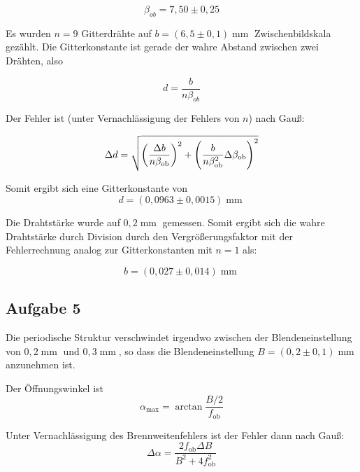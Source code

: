 \documentclass[a4paper,german,12pt,smallheadings]{scrartcl}
\begin{document}
\begin{equation}
  \beta_{ob} = 7{,}50 \pm 0{,}25
\end{equation}

Es wurden $n = 9$ Gitterdrähte auf $b = (6{,}5\pm0{,}1) \operatorname{mm}$
Zwischenbildskala gezählt. Die Gitterkonstante ist gerade der wahre Abstand
zwischen zwei Drähten, also

\begin{equation}
  d = \frac{b}{n \beta_{ob}}
\end{equation}

Der Fehler ist (unter Vernachlässigung der Fehlers von $n$) nach Gauß:

\begin{equation}
  \Delta d = \sqrt{
    \del{\frac{\Delta b}{n \beta_\text{ob}}}^2 +
    \del{\frac{b}{n \beta_\text{ob}^2} \Delta \beta_\text{ob}}^2
  }
\end{equation}

Somit ergibt sich eine Gitterkonstante von
\begin{equation}
  d = (0{,}0963 \pm 0{,}0015) \operatorname{mm}
\end{equation}

Die Drahtstärke wurde auf $0{,}2 \operatorname{mm}$ gemessen. Somit ergibt sich
die wahre Drahtstärke durch Division durch den Vergrößerungsfaktor mit der
Fehlerrechnung analog zur Gitterkonstanten mit $n = 1$ als:

\begin{equation}
  b = (0{,}027\pm0{,}014) \operatorname{mm}
\end{equation}

\subsection{Aufgabe 5}

Die periodische Struktur verschwindet irgendwo zwischen der Blendeneinstellung
von $0{,}2 \operatorname{mm}$ und $0{,}3 \operatorname{mm}$, so dass die
Blendeneinstellung $B = (0{,}2 \pm 0{,}1) \operatorname{mm}$ anzunehmen ist.

Der Öffnungswinkel ist
\begin{equation}
  \alpha_\text{max} = \arctan \frac{B/2}{f_\text{ob}}
\end{equation}

Unter Vernachlässigung des Brennweitenfehlers ist der Fehler dann nach Gauß:
\begin{equation}
  \Delta \alpha = \frac{2 f_\text{ob} \Delta B}{B^2 + 4f_\text{ob}^2}
\end{equation}
\end{document}
